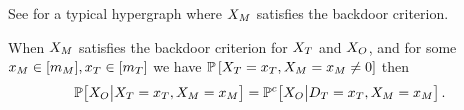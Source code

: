 See  for a typical hypergraph where $X_{M}$ satisfies the backdoor criterion.

\begin{lemma}\label{lem:bdCriterionMediatorCond}
    When $X_{M}$ satisfies the backdoor criterion for $X_{T}$ and $X_{O}$, and for some $x_{M}\in[m_{M}],x_{T}\in[m_{T}]$ we have $\mathbb{P}\left[X_{T}=x_{T},X_{M}=x_{M}\neq 0\right]$ then
    \begin{align*}
        \mathbb{P}\big[X_{O}\big|X_{T}=x_{T},X_{M}=x_{M}\big]
        = \mathbb{P}^{c}\big[X_{O}\big|D_{T}=x_{T},X_{M}=x_{M}\big] \, .
    \end{align*}
\end{lemma}
